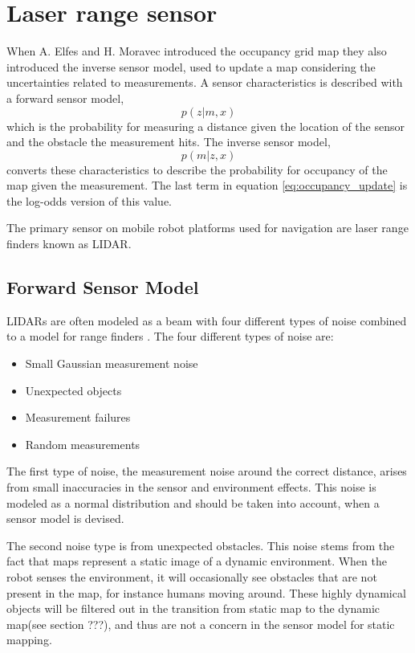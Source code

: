 \section{Laser range sensor}
\label{sec:laser_range_sensor}
When A. Elfes and H. Moravec introduced the occupancy grid map they also introduced the inverse sensor model, used to update a map considering the uncertainties related to measurements. 
A sensor characteristics is described with a forward sensor model, 
\begin{equation*}
	p(z|m,x)
\end{equation*}
which is the probability for measuring a distance given the location of the sensor and the obstacle the measurement hits. 
The inverse sensor model,
\begin{equation*}
	p(m|z,x)
\end{equation*}
converts these characteristics to describe the probability for occupancy of the map given the measurement. The last term in equation \vref{eq:occupancy_update} is the log-odds version of this value.

The primary sensor on mobile robot platforms used for navigation are laser range finders known as LIDAR.

\subsection{Forward Sensor Model}
LIDARs are often modeled as a beam with four different types of noise combined to a model for range finders \cite{probRob}.
The four different types of noise are:

\begin{itemize}
	\item Small Gaussian measurement noise
	\item Unexpected objects
	\item Measurement failures
	\item Random measurements
\end{itemize}

The first type of noise, the measurement noise around the correct distance, arises from small inaccuracies in the sensor and environment effects. This noise is modeled as a normal distribution and should be taken into account, when a sensor model is devised. 

The second noise type is from unexpected obstacles. This noise stems from the fact that maps represent a static image of a dynamic environment. When the robot senses the environment, it will occasionally see obstacles that are not present in the map, for instance humans moving around. These highly dynamical objects will be filtered out in the transition from static map to the dynamic map(see section ???), and thus are not a concern in the sensor model for static mapping.

